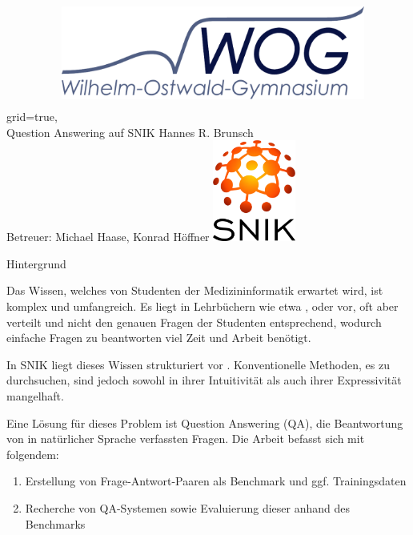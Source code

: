 \documentclass[portrait,final,a0paper,fontscale=0.320]{imiseposter}
\begin{document}
\begin{poster}%
  {grid=true,}
  {\hspace{3em}\includegraphics[height=4.5cm, width=10cm, keepaspectratio]{img/logos/wog-logo-mit-text.pdf}} 
  {Question Answering auf SNIK}
  {Hannes R. Brunsch\\
  Betreuer: Michael Haase, Konrad H{\"o}ffner}
  {\includegraphics[height=9.0em]{img/logos/snik-logo.png}}

\begin{posterbox}[name=background,column=0,row=0]{Hintergrund}

Das Wissen, welches von Studenten der Medizininformatik erwartet wird, ist komplex und umfangreich.
Es liegt in Lehrbüchern wie etwa \cite{bb}, \cite{ob} oder \cite{he} vor, oft aber verteilt und nicht den genauen Fragen der Studenten entsprechend,
wodurch einfache Fragen zu beantworten viel Zeit und Arbeit benötigt.

In SNIK liegt dieses Wissen strukturiert vor \cite{snik}.
Konventionelle Methoden, es zu durchsuchen, sind jedoch sowohl in ihrer Intuitivität als auch ihrer Expressivität mangelhaft.

Eine Lösung für dieses Problem ist Question Answering (QA), die Beantwortung von in natürlicher Sprache verfassten Fragen.
Die Arbeit befasst sich mit folgendem:
\begin{enumerate}
  \item Erstellung von Frage-Antwort-Paaren als Benchmark und ggf. Trainingsdaten
  \item Recherche von QA-Systemen sowie Evaluierung dieser anhand des Benchmarks
\end{enumerate}


\end{posterbox}
\end{poster}
\end{document}
